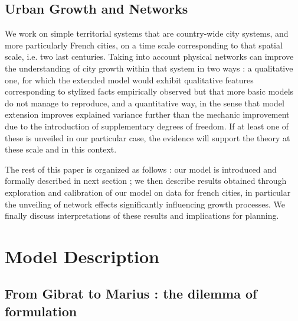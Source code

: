 \documentclass[Royal,sageh,times]{sagej}
\begin{document}


\subsection{Urban Growth and Networks}







We work on simple territorial systems that are country-wide city systems, and more particularly French cities, on a time scale corresponding to that spatial scale, i.e. two last centuries. Taking into account physical networks can improve the understanding of city growth within that system in two ways : a qualitative one, for which the extended model would exhibit qualitative features corresponding to stylized facts empirically observed but that more basic models do not manage to reproduce, and a quantitative way, in the sense that model extension improves explained variance further than the mechanic improvement due to the introduction of supplementary degrees of freedom. If at least one of these is unveiled in our particular case, the evidence will support the theory at these scale and in this context.



The rest of this paper is organized as follows : our model is introduced and formally described in next section ; we then describe results obtained through exploration and calibration of our model on data for french cities, in particular the unveiling of network effects significantly influencing growth processes. We finally discuss interpretations of these results and implications for planning.





\section{Model Description}




\subsection{From Gibrat to Marius : the dilemma of formulation}

\end{document}
